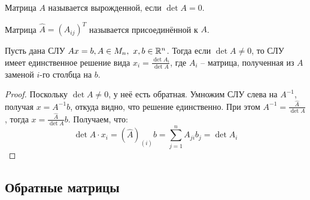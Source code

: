 \documentclass[12pt]{article}
\begin{document}
\begin{definition}
	Матрица $A$ называется вырожденной, если $\det A=0$.
\end{definition}
\begin{definition}
	Матрица $\widehat{A}=(A_{ij})^T$ называется присоединённой к $A$.
\end{definition}
\begin{theorem}
	Пусть дана СЛУ $Ax=b, A\in M_n,\ x, b\in\mathbb{R}^n$. Тогда если $\det
	A\neq0$, то СЛУ имеет единственное решение вида $x_i=\frac{\det
	A_i}{\det A}$, где $A_i$ -- матрица, полученная из $A$ заменой
	$i$-го столбца на $b$.
	\begin{proof}
		Поскольку $\det A\neq0$, у неё есть обратная. Умножим СЛУ слева на
		$A^{-1}$, получая $x=A^{-1}b$, откуда видно, что решение
		единственно. При этом $A^{-1}=\frac{\widehat{A}}{\det A}$, тогда
		$x=\frac{\widehat{A}}{\det A}b$. Получаем, что:
		\[\det A\cdot x_i=(\widehat{A})_{(i)}b=\sum_{j=1}^{n}A_{ji}b_j=\det A_i\]	
	\end{proof}
\end{theorem}

\subsection{Обратные матрицы}
\end{document}
